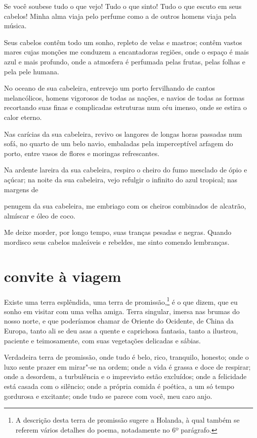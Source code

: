 Se você soubese tudo o que vejo! Tudo o que sinto! Tudo o que escuto
em seus cabelos! Minha alma viaja pelo perfume como a de
outros homens viaja pela música.

Seus cabelos contêm todo um sonho, repleto de velas e mastros; contêm
vastos mares cujas monções me conduzem a encantadoras regiões, onde o
espaço é mais azul e mais profundo, onde a atmosfera é perfumada pelas
frutas, pelas folhas e pela pele humana.

No oceano de sua cabeleira, entrevejo um porto fervilhando de cantos
melancólicos, homens vigorosos de todas as nações, e navios de todas as
formas recortando suas finas e complicadas estruturas num céu imenso,
onde se estira o calor eterno.

Nas carícias da sua cabeleira, revivo os langores de longas horas
passadas num sofá, no quarto de um belo navio, embaladas pela
imperceptível arfagem do porto, entre vasos de flores e moringas
refrescantes.

Na ardente lareira da sua cabeleira, respiro o cheiro do fumo mesclado
de ópio e açúcar; na noite da sua cabeleira, vejo refulgir o infinito
do azul tropical; nas margens de \linebreak

\quebra

\noindent{}penugem da sua cabeleira, me embriago
com os cheiros combinados de alcatrão, almíscar e óleo de coco.

Me deixe morder, por longo tempo, suas tranças pesadas e negras. Quando
mordisco seus cabelos maleáveis e rebeldes, me sinto comendo
lembranças.

\quebra\section[Convite à viagem]{convite à viagem}

Existe uma terra esplêndida, uma terra de promissão,\protect\footnote{ 
 A descrição desta terra de promissão sugere a Holanda, à qual também
se referem vários detalhes do poema, notadamente no 6º parágrafo.}
é o que dizem, que eu sonho em visitar com uma velha amiga. Terra
singular, imersa nas brumas do nosso norte, e que poderíamos chamar de
Oriente do Ocidente, de China da Europa, tanto ali se deu asas a
quente e caprichosa fantasia, tanto a ilustrou, paciente e
teimosamente, com suas vegetações delicadas e sábias.

Verdadeira terra de promissão, onde tudo é belo, rico, tranquilo,
honesto; onde o luxo sente prazer em mirar"-se na ordem; onde a vida é
grassa e doce de respirar; onde a desordem, a turbulência e o
imprevisto estão excluídos; onde a felicidade está casada com o
silêncio; onde a própria comida é poética, a um
só tempo gordurosa e excitante; onde tudo se parece com você, meu caro anjo.

